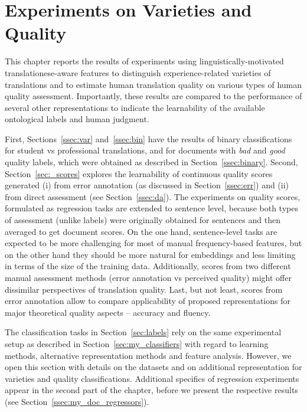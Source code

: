 \chapter{\label{cha:pro_qua}Experiments on Varieties and Quality}
This chapter reports the results of experiments using linguistically-motivated translationese-aware features to distinguish experience-related varieties of translations and to estimate human translation quality on various types of human quality assessment. Importantly, these results are compared to the performance of several other representations to indicate the learnability of the available ontological labels and human judgment. 


First, Sections~\ref{ssec:var} and~\ref{ssec:bin} have the results of binary classifications for student vs professional translations, and for documents with \textit{bad} and \textit{good} quality labels, which were obtained as described in Section~\ref{ssec:binary}. 
Second, Section~\ref{sec:_scores} explores the learnability of continuous quality scores generated (i) from  error annotation (as discussed in Section~\ref{ssec:err}) and (ii) from direct assessment (see Section~\ref{ssec:da}). The experiments on quality scores, formulated as regression tasks are extended to sentence level, because both types of assessment (unlike labels) were originally obtained for sentences and then averaged to get document scores. 
On the one hand, sentence-level tasks are expected to be more challenging for most of manual frequency-based features, but on the other hand they should be more natural for embeddings and less limiting in terms of the size of the training data. Additionally, scores from two different manual assessment methods (error annotation vs perceived quality) might offer dissimilar perspectives of translation quality.
Last, but not least, scores from error annotation allow to compare applicability of proposed representations for major theoretical quality aspects -- accuracy and fluency.

The classification tasks in Section~\ref{sec:labels} rely on the same experimental setup as described in Section~\ref{sec:my_classifiers} with regard to learning methods, alternative representation methods and feature analysis. However, we open this section with details on the datasets and on additional representation for varieties and quality classifications.
Additional specifics of regression experiments appear in the second part of the chapter, before we present the respective results (see Section~\ref{ssec:my_doc_regressors}).

